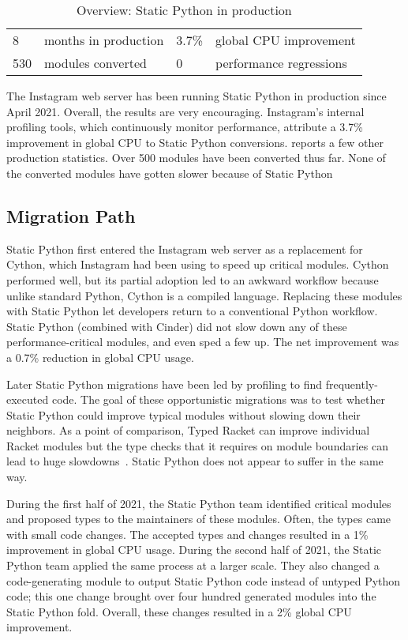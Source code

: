 \documentclass[english,cleveref,submission]{programming}
\newcommand{\SP}{Static Python}
\begin{document}
\begin{table}
  \caption{Overview: \SP{} in production}
  \label{t:prod-stat}
  \begin{tabular}{l@{~~}ll@{~~}l}
    8     & months in production & 3.7\% & global CPU improvement \\
    530   & modules converted  &  0 & performance regressions
  \end{tabular}
\end{table}

The Instagram web server has been running \SP{} in production since April 2021.
Overall, the results are very encouraging.
Instagram's internal profiling tools, which continuously monitor
performance, attribute a 3.7\% improvement in global CPU to \SP{} conversions.
 reports a few other production statistics.
Over 500 modules have been converted thus far.
None of the converted modules have gotten slower because of \SP{}


\subsection{Migration Path}

\SP{} first entered the Instagram web server as a replacement for Cython,
which Instagram had been using to speed up critical modules.
Cython performed well, but its partial adoption led to an awkward workflow
because unlike standard Python, Cython is a compiled language.
Replacing these modules with \SP{} let developers return to a conventional
Python workflow.
\SP{} (combined with Cinder) did not slow down any of these
performance-critical modules, and even sped a few up.
The net improvement was a 0.7\% reduction in global CPU usage.

Later \SP{} migrations have been led by profiling to find frequently-executed code.
The goal of these opportunistic migrations was to test whether \SP{} could
improve typical modules without slowing down their neighbors.
As a point of comparison, Typed Racket can improve individual Racket
modules but the type checks that it requires on module boundaries
can lead to huge slowdowns~\cite{tfgnvf-popl-2016,gtnffvf-jfp-2019}.
\SP{} does not appear to suffer in the same way.

During the first half of 2021, the \SP{} team identified critical
modules and proposed types to the maintainers of these modules.
Often, the types came with small code changes.
The accepted types and changes resulted in a 1\% improvement
in global CPU usage.
During the second half of 2021, the \SP{} team applied the same
process at a larger scale.
They also changed a code-generating module to output \SP{} code instead
of untyped Python code;
this one change brought over four hundred generated modules into the \SP{} fold.
Overall, these changes resulted in a 2\% global CPU improvement.
\end{document}
